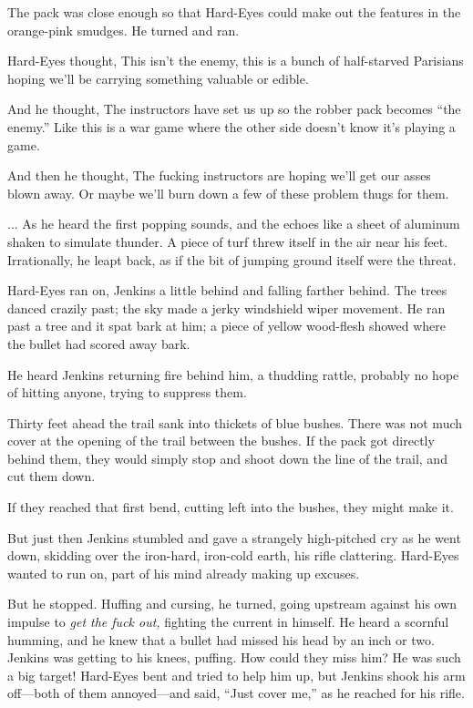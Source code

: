 The pack was close enough so that Hard-Eyes could make out the features in the orange-pink smudges. He turned and ran.

Hard-Eyes thought, This isn't the enemy, this is a bunch of half-starved Parisians hoping we'll be carrying something valuable or edible.

And he thought, The instructors have set us up so the robber pack becomes ``the enemy.'' Like this is a war game where the other side doesn't know it's playing a game.

And then he thought, The fucking instructors are hoping we'll get our asses blown away. Or maybe we'll burn down a few of these problem thugs for them.

... As he heard the first popping sounds, and the echoes like a sheet of aluminum shaken to simulate thunder. A piece of turf threw itself in the air near his feet. Irrationally, he leapt back, as if the bit of jumping ground itself were the threat.

Hard-Eyes ran on, Jenkins a little behind and falling farther behind. The trees danced crazily past; the sky made a jerky windshield wiper movement. He ran past a tree and it spat bark at him; a piece of yellow wood-flesh showed where the bullet had scored away bark.

He heard Jenkins returning fire behind him, a thudding rattle, probably no hope of hitting anyone, trying to suppress them.

Thirty feet ahead the trail sank into thickets of blue bushes. There was not much cover at the opening of the trail between the bushes. If the pack got directly behind them, they would simply stop and shoot down the line of the trail, and cut them down.

If they reached that first bend, cutting left into the bushes, they might make it.

But just then Jenkins stumbled and gave a strangely high-pitched cry as he went down, skidding over the iron-hard, iron-cold earth, his rifle clattering. Hard-Eyes wanted to run on, part of his mind already making up excuses.

But he stopped. Huffing and cursing, he turned, going upstream against his own impulse to \textit{get the fuck out,} fighting the current in himself. He heard a scornful humming, and he knew that a bullet had missed his head by an inch or two. Jenkins was getting to his knees, puffing. How could they miss him? He was such a big target! Hard-Eyes bent and tried to help him up, but Jenkins shook his arm off---both of them annoyed---and said, ``Just cover me,'' as he reached for his rifle.


